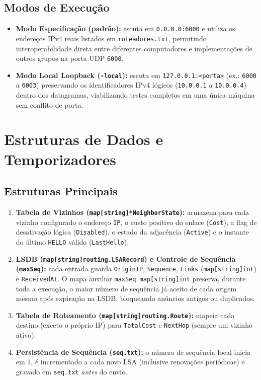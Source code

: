 ﻿\documentclass[11pt,a4paper]{article}
\begin{document}
\subsection{Modos de Execução}
\begin{itemize}
    \item \textbf{Modo Especificação (padrão):} escuta em \texttt{0.0.0.0:6000} e utiliza os endereços IPv4 reais listados em \texttt{roteadores.txt}, permitindo interoperabilidade direta entre diferentes computadores e implementações de outros grupos na porta UDP \texttt{6000}.
    \item \textbf{Modo Local Loopback (\texttt{-local}):} escuta em \texttt{127.0.0.1:<porta>} (ex.: \texttt{6000} a \texttt{6003}) preservando os identificadores IPv4 lógicos (\texttt{10.0.0.1} a \texttt{10.0.0.4}) dentro dos datagramas, viabilizando testes completos em uma única máquina sem conflito de porta.
\end{itemize}

\section{Estruturas de Dados e Temporizadores}

\subsection{Estruturas Principais}
\begin{enumerate}
    \item \textbf{Tabela de Vizinhos (\texttt{map[string]*NeighborState}):} armazena para cada vizinho configurado o endereço \texttt{IP}, o custo positivo do enlace (\texttt{Cost}), a flag de desativação lógica (\texttt{Disabled}), o estado da adjacência (\texttt{Active}) e o instante do último \texttt{HELLO} válido (\texttt{LastHello}).
    \item \textbf{LSDB (\texttt{map[string]routing.LSARecord}) e Controle de Sequência (\texttt{maxSeq}):} cada entrada guarda \texttt{OriginIP}, \texttt{Sequence}, \texttt{Links} (\texttt{map[string]int}) e \texttt{ReceivedAt}. O mapa auxiliar \texttt{maxSeq map[string]int} preserva, durante toda a execução, o maior número de sequência já aceito de cada origem mesmo após expiração na LSDB, bloqueando anúncios antigos ou duplicados.
    \item \textbf{Tabela de Roteamento (\texttt{map[string]routing.Route}):} mapeia cada destino (exceto o próprio IP) para \texttt{TotalCost} e \texttt{NextHop} (sempre um vizinho ativo).
    \item \textbf{Persistência de Sequência (\texttt{seq.txt}):} o número de sequência local inicia em 1, é incrementado a cada novo LSA (inclusive renovações periódicas) e gravado em \texttt{seq.txt} \emph{antes} do envio.
\end{enumerate}
\end{document}
